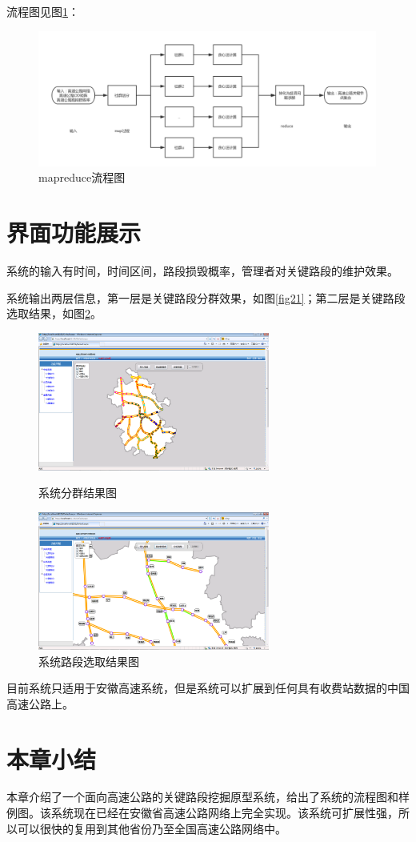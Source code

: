 		流程图见图\ref{mapreduce}：
		\begin{figure}[h]
		\centering
				\begin{minipage}{0.8\linewidth}
					\centering
					\includegraphics[width=4.4in]{picture/mapreduce}
					\caption{mapreduce流程图}
					\label{mapreduce}
				\end{minipage}%
		\end{figure}


		
	\section{界面功能展示}

		系统的输入有时间，时间区间，路段损毁概率，管理者对关键路段的维护效果。

		系统输出两层信息，第一层是关键路段分群效果，如图\ref{fig21}；第二层是关键路段选取结果，如图\ref{fig22}。

						\begin{figure}[h]
				\begin{minipage}{0.5\linewidth}
					\centering
					\includegraphics[width=3.0in]{picture/yuanxing1}
					\caption{系统分群结果图}
					\label{fig21}
				\end{minipage}%
				\begin{minipage}{0.5\linewidth}
					\centering
					\includegraphics[width=3.0in]{picture/yuanxing2}
					\caption{系统路段选取结果图}
					\label{fig22}
				\end{minipage}
				\end{figure}

		目前系统只适用于安徽高速系统，但是系统可以扩展到任何具有收费站数据的中国高速公路上。

	\section{本章小结}
		本章介绍了一个面向高速公路的关键路段挖掘原型系统，给出了系统的流程图和样例图。该系统现在已经在安徽省高速公路网络上完全实现。该系统可扩展性强，所以可以很快的复用到其他省份乃至全国高速公路网络中。

	